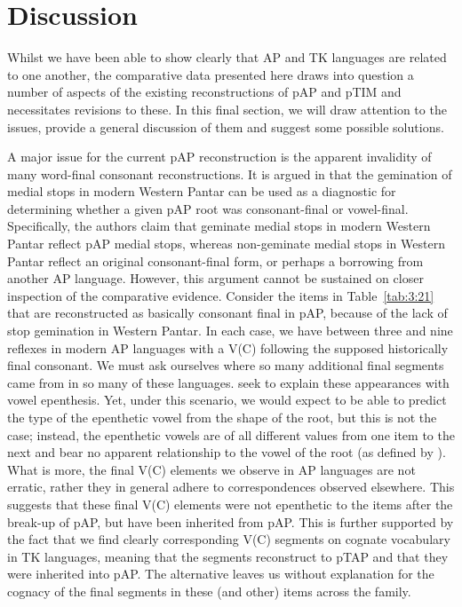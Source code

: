 \section{Discussion}\label{sec:3:4}
Whilst we have been able to show clearly that AP and TK languages are related to one another, the comparative data presented here draws into question a number of aspects of the existing reconstructions of pAP and pTIM and necessitates revisions to these. In this final section, we will draw attention to the issues, provide a general discussion of them and suggest some possible solutions.

A major issue for the current pAP reconstruction is the apparent invalidity of many word-final consonant reconstructions. It is argued in \citet[95]{HoltonEtAl2012} that the gemination of medial stops in modern Western Pantar can be used as a diagnostic for determining whether a given pAP root was consonant-final or vowel-final. Specifically, the authors claim that geminate medial stops in modern Western Pantar reflect pAP medial stops, whereas non-geminate medial stops in Western Pantar reflect an original consonant-final form, or perhaps a borrowing from another AP language. However, this argument cannot be sustained on closer inspection of the comparative evidence. Consider the items in Table~\ref{tab:3:21} that are reconstructed as basically consonant final in pAP, because of the lack of stop gemination in Western Pantar. In each case, we have between three and nine reflexes in modern AP languages with a V(C) following the supposed historically final consonant. We must ask ourselves where so many additional final segments came from in so many of these languages. \citet{HoltonEtAl2012} seek to explain these appearances with vowel epenthesis. Yet, under this scenario, we would expect to be able to predict the type of the epenthetic vowel from the shape of the root, but this is not the case; instead, the epenthetic vowels are of all different values from one item to the next and bear no apparent relationship to the vowel of the root (as defined by \citealt{HoltonEtAl2012}). What is more, the final V(C) elements we observe in AP languages are not erratic, rather they in general adhere to correspondences observed elsewhere. This suggests that these final V(C) elements were not epenthetic to the items after the break-up of pAP, but have been inherited from pAP. This is further supported by the fact that we find clearly corresponding V(C) segments on cognate vocabulary in TK languages, meaning that the segments reconstruct to pTAP and that they were inherited into pAP. The alternative leaves us without explanation for the cognacy of the final segments in these (and other) items across the family. 
 

